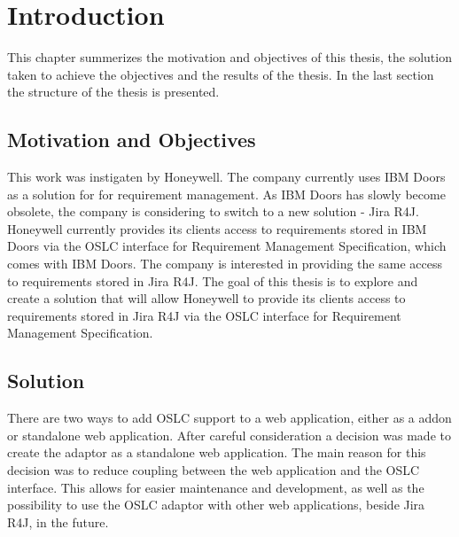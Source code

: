 
% 

\chapter{Introduction}
This chapter summerizes the motivation and objectives of this thesis, the solution taken to achieve the objectives and the results of the thesis. In the last section the structure of the thesis is presented.

\section{Motivation and Objectives}
This work was instigaten by Honeywell. The company currently uses IBM Doors as a solution for for requirement management. As IBM Doors has slowly become obsolete, the company is considering to switch to a new solution - Jira R4J. Honeywell currently provides its clients access to requirements stored in IBM Doors via the OSLC interface for Requirement Management Specification, which comes with IBM Doors. The company is interested in providing the same access to requirements stored in Jira R4J. The goal of this thesis is to explore and create a solution that will allow Honeywell to provide its clients access to requirements stored in Jira R4J via the OSLC interface for Requirement Management Specification.

\section{Solution}
There are two ways to add OSLC support to a web application, either as a addon or standalone web application. After careful consideration a decision was made to create the adaptor as a standalone web application. The main reason for this decision was to reduce coupling between the web application and the OSLC interface. This allows for easier maintenance and development, as well as the possibility to use the OSLC adaptor with other web applications, beside Jira R4J, in the future. 

